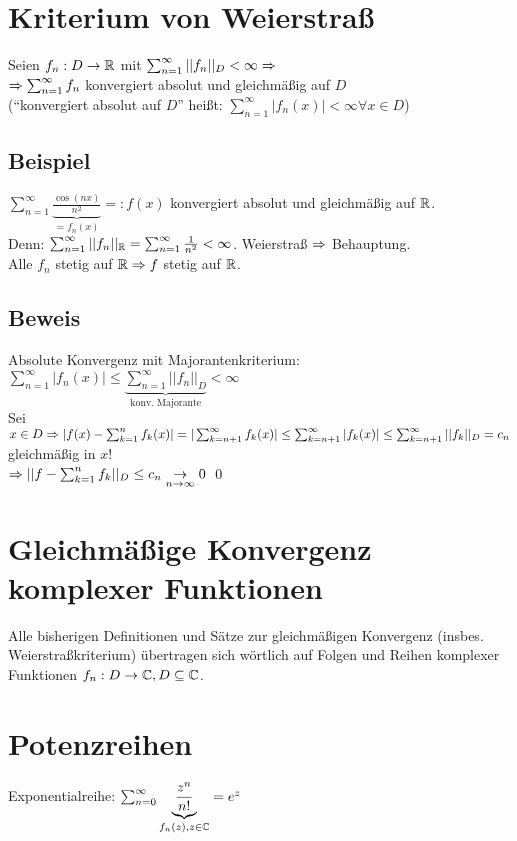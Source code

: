 \section{Kriterium von Weierstraß}\label{13.6}
Seien $f_n: D \to \mathbb{R}$ mit $\sum_{n=1}^\infty ||f_n||_D < \infty \Rightarrow$\\
$\Rightarrow \sum_{n=1}^\infty f_n$ konvergiert absolut und gleichmäßig auf $D$\\
("`konvergiert absolut auf $D$"' heißt: $\sum_{n=1}^\infty |f_n(x)| < \infty \forall x \in D$)

\subsection*{Beispiel}
$\sum_{n=1}^\infty \underbrace{\frac{\cos(nx)}{n^2}}_{=f_n(x)} =: f(x)$ konvergiert absolut und gleichmäßig auf $\mathbb{R}$.\\
Denn: $\sum_{n=1}^\infty ||f_n||_{\mathbb{R}} = \sum_{n=1}^\infty \frac{1}{n^2} < \infty$. Weierstraß $\Rightarrow$ Behauptung.\\
Alle $f_n$ stetig auf $\mathbb{R} \Rightarrow f$ stetig auf $\mathbb{R}$.

\subsection*{Beweis}
Absolute Konvergenz mit Majorantenkriterium: $\sum_{n=1}^\infty |f_n(x)| \le \underbrace{\sum_{n=1}^\infty ||f_n||_D}_{\text{konv. Majorante}} < \infty$\\
Sei $x \in D \Rightarrow |f(x) - \sum_{k=1}^n f_k(x)| = |\sum_{k=n+1}^\infty f_k(x)| \le \sum_{k=n+1}^\infty |f_k(x)| \le \sum_{k=n+1}^\infty ||f_k||_D = c_n$ gleichmäßig in $x$!\\
$\Rightarrow ||f-\sum_{k=1}^n f_k||_D \le c_n \underset{n \to \infty}{\to} 0$ \qed

\section{Gleichmäßige Konvergenz komplexer Funktionen}\label{13.7}
Alle bisherigen Definitionen und Sätze zur gleichmäßigen Konvergenz (insbes. Weierstraßkriterium) übertragen sich wörtlich auf Folgen und Reihen komplexer Funktionen $f_n: D \to \mathbb{C}, D \subseteq \mathbb{C}$.

\section*{Potenzreihen}
Exponentialreihe: $\sum_{n=0}^\infty \underbrace{\frac{z^n}{n!}}_{f_n(z), z \in \mathbb{C}} = e^z$

